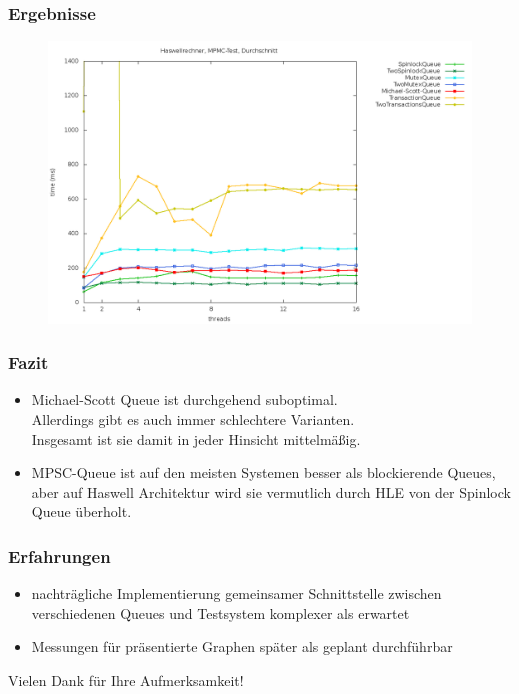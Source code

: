 \documentclass[svgnames]{beamer}
\begin{document}
\begin{frame}
\frametitle{Ergebnisse}
\begin {figure}
      \begin{center}
	\includegraphics[width=\textwidth]{fastboxma.png}
     \end{center}
\end {figure}
\end{frame}


\begin{frame}
\frametitle{Fazit}
\begin{itemize}
\item Michael-Scott Queue ist durchgehend suboptimal.\\
	Allerdings gibt es auch immer schlechtere Varianten.\\
	Insgesamt ist sie damit in jeder Hinsicht mittelm\"a\ss{}ig.
\item MPSC-Queue ist auf den meisten Systemen besser als blockierende Queues,
	aber auf Haswell Architektur wird sie vermutlich durch HLE von der Spinlock Queue \"uberholt.
\end{itemize}
\end{frame}


\begin{frame}
\frametitle{Erfahrungen}
\begin{itemize}
\item nachtr\"agliche Implementierung gemeinsamer Schnittstelle zwischen verschiedenen Queues und Testsystem komplexer als erwartet
\item Messungen f\"ur pr\"asentierte Graphen sp\"ater als geplant durchf\"uhrbar
\end{itemize}
\end{frame}



\begin{frame}
\Large{\centerline{Vielen Dank f\"ur Ihre Aufmerksamkeit!}}
\end{frame}
\end{document}
